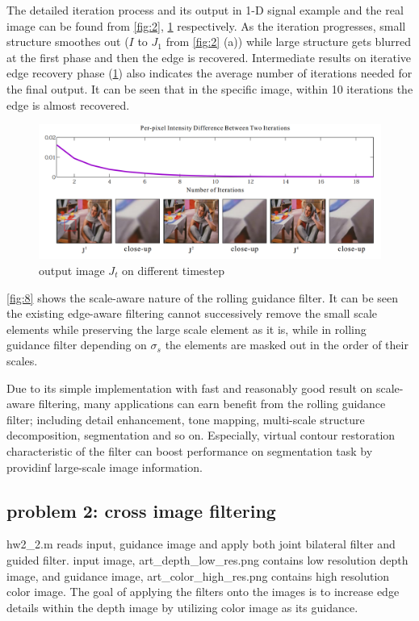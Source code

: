 \documentclass[extendedabs]{bmvc2k}
\begin{document}
The detailed iteration process and its output in 1-D signal example and the real image can be
found from \figurename{\ref{fig:2}}, \figurename{\ref{fig:7}} respectively.
As the iteration progresses, small structure smoothes out ($I$ to $J_1$ from 
\figurename{\ref{fig:2}} (a)) while large structure gets blurred
at the first phase and then the edge is recovered.
Intermediate results on iterative edge recovery phase (\figurename{\ref{fig:7}}) also indicates 
the average number of iterations needed for the final output. It can be seen that in the
specific image, within 10 iterations the edge is almost recovered.

\begin{figure}[h]
    \centering
    \includegraphics[width=\linewidth]{hw2_1_7}
    \caption{output image $J_t$ on different timestep}
    \label{fig:7}
\end{figure}

\figurename{\ref{fig:8}} shows the scale-aware nature of the rolling guidance filter.
It can be seen the existing edge-aware filtering cannot successively remove the small scale
elements while preserving the large scale element as it is, while in rolling guidance filter
depending on $\sigma_s$ the elements are masked out in the order of their scales. 

Due to its simple implementation with fast and reasonably good result on scale-aware
filtering, many applications can earn benefit from the rolling guidance filter; including
detail enhancement, tone mapping, multi-scale structure decomposition, segmentation
and so on. Especially, virtual contour restoration characteristic of the filter can
boost performance on segmentation task by providinf large-scale image information.

\pagebreak
\subsection*{problem 2: cross image filtering}

hw2\_2.m reads input, guidance image and apply both joint bilateral filter and guided filter.
input image, art\_depth\_low\_res.png contains low resolution depth image, 
and guidance image, art\_color\_high\_res.png
contains high resolution color image. The goal of applying the filters onto the images
is to increase edge details within the depth image by utilizing color image as its
guidance.
\end{document}
